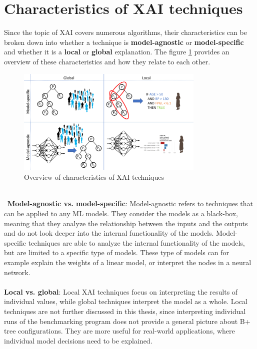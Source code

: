 \section{Characteristics of XAI techniques}
Since the topic of \ac{XAI} covers numerous algorithms, their characteristics can be broken down into whether a technique is \textbf{model-agnostic} or \textbf{model-specific} and whether it is a \textbf{local} or \textbf{global} explanation. The figure \ref{fig:xaioverview} provides an overview of these characteristics and how they relate to each other. 
\begin{figure}[h]
      \centering
      \includegraphics[width=0.8\textwidth]{images/XAI_overview.jpg}
      \caption{Overview of characteristics of XAI techniques \parencite{xaioverview}}
      \label{fig:xaioverview}
  \end{figure}
\\\
\textbf{Model-agnostic vs. model-specific}: Model-agnostic refers to techniques that can be applied to any \ac{ML} models. They consider the models as a black-box, meaning that they analyze the relationship between the inputs and the outputs and do not look deeper into the internal functionality of the models. Model-specific techniques are able to analyze the internal functionality of the models, but are limited to a specific type of models. These type of models can for example explain the weights of a linear model, or interpret the nodes in a neural network. 
\\\\
\textbf{Local vs. global}: Local \ac{XAI} techniques focus on interpreting the results of individual values, while global techniques interpret the model as a whole. Local techniques are not further discussed in this thesis, since interpreting individual runs of the benchmarking program does not provide a general picture about B+ tree configurations. They are more useful for real-world applications, where individual model decisions need to be explained. 
